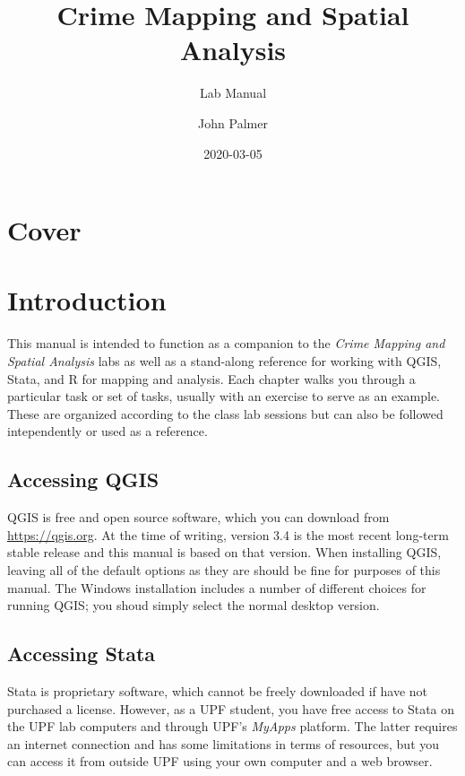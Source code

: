 \documentclass[]{book}
\title{Crime Mapping and Spatial Analysis}
\subtitle{Lab Manual}
\author{John Palmer}
\date{2020-03-05}
\begin{document}
\maketitle

{
\setcounter{tocdepth}{1}
\tableofcontents
}
\hypertarget{cover}{%
\chapter*{Cover}\label{cover}}

\hypertarget{introduction}{%
\chapter*{Introduction}\label{introduction}}

This manual is intended to function as a companion to the \emph{Crime Mapping and Spatial Analysis} labs as well as a stand-along reference for working with QGIS, Stata, and R for mapping and analysis. Each chapter walks you through a particular task or set of tasks, usually with an exercise to serve as an example. These are organized according to the class lab sessions but can also be followed intependently or used as a reference.

\hypertarget{accessing-qgis}{%
\section*{Accessing QGIS}\label{accessing-qgis}}

QGIS is free and open source software, which you can download from \url{https://qgis.org}. At the time of writing, version 3.4 is the most recent long-term stable release and this manual is based on that version. When installing QGIS, leaving all of the default options as they are should be fine for purposes of this manual. The Windows installation includes a number of different choices for running QGIS; you shoud simply select the normal desktop version.

\hypertarget{accessing-stata}{%
\section*{Accessing Stata}\label{accessing-stata}}

Stata is proprietary software, which cannot be freely downloaded if have not purchased a license. However, as a UPF student, you have free access to Stata on the UPF lab computers and through UPF's \emph{MyApps} platform. The latter requires an internet connection and has some limitations in terms of resources, but you can access it from outside UPF using your own computer and a web browser.
\end{document}
